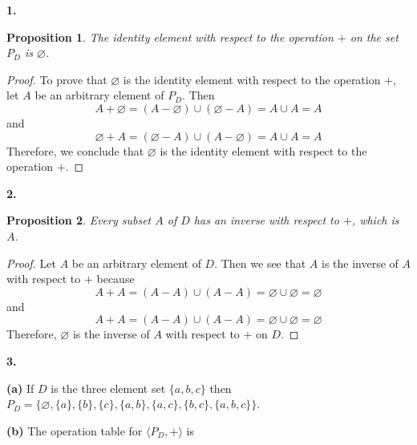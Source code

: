 \documentclass[12pt]{article}   %
\newtheorem*{proposition}{Proposition}  %
\let\emptyset\varnothing
\begin{document}
\bigskip

\noindent\textbf{1.} 
\begin{proposition}
The identity element with respect to the operation $+$ on the set $P_D$ is $\emptyset$.
\end{proposition}
\begin{proof}
To prove that $\emptyset$ is the identity element with respect to the operation $+$, let $A$ be an arbitrary element of $P_D$. Then
\begin{equation*}
A + \emptyset = (A - \emptyset) \cup (\emptyset - A) = A \cup A = A
\end{equation*}
and
\begin{equation*}
\emptyset + A = (\emptyset - A) \cup (A - \emptyset) = A \cup A = A
\end{equation*}
Therefore, we conclude that $\emptyset$ is the identity element with respect to the operation $+$.
\end{proof}


\bigskip
\noindent\textbf{2.}
\begin{proposition}
Every subset $A$ of $D$ has an inverse with respect to $+$, which is $A$.
\end{proposition}
\begin{proof}
Let $A$ be an arbitrary element of $D$. Then we see that $A$ is the inverse of $A$ with respect to $+$ because
\begin{equation*}
A + A = (A - A) \cup (A - A) = \emptyset \cup \emptyset = \emptyset
\end{equation*}
and
\begin{equation*}
A + A = (A - A) \cup (A - A) = \emptyset \cup \emptyset = \emptyset
\end{equation*}
Therefore, $\emptyset$ is the inverse of $A$ with respect to $+$ on $D$.
\end{proof}

\bigskip
\noindent\textbf{3.} 

\smallskip
\noindent\textbf{(a)} If $D$ is the three element set $\{a,b,c\}$ then $P_D = \{\emptyset, \{a\}, \{b\}, \{c\}, \{a,b\}, \{a,c\}, \{b,c\}, \{a,b,c\} \}$.

\bigskip
\noindent\textbf{(b)}
The operation table for $\langle P_D, + \rangle$ is \\
\end{document}
